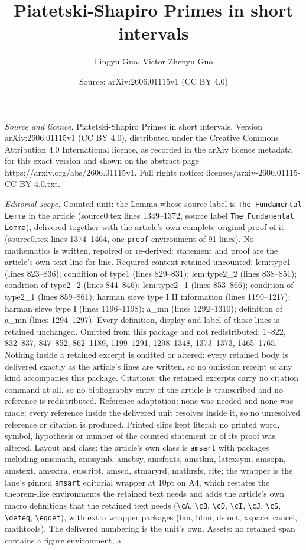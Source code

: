 \documentclass[10pt,a4paper]{amsart}
\title[Piatetski-Shapiro Primes in short intervals]{Piatetski-Shapiro Primes in short intervals}
\author{Lingyu Guo, Victor Zhenyu Guo}
\date{Source: arXiv:2606.01115v1 (CC BY 4.0)}
\begin{document}
\maketitle

\noindent\emph{Source and licence.} Piatetski-Shapiro Primes in short intervals. Version arXiv:2606.01115v1 (CC BY 4.0), distributed under the Creative Commons Attribution 4.0 International licence, as recorded in the arXiv licence metadata for this exact version and shown on the abstract page https://arxiv.org/abs/2606.01115v1. Full rights notice: licenses/arxiv-2606.01115-CC-BY-4.0.txt.\par\smallskip

\noindent\textit{Editorial scope.} Counted unit: the Lemma whose source label is \texttt{The Fundamental Lemma} in the article (source0.tex lines 1349--1372, source label \texttt{The Fundamental Lemma}), delivered together with the article's own complete original proof of it (source0.tex lines 1374--1464, one \texttt{proof} environment of 91 lines). No mathematics is written, repaired or re-derived: statement and proof are the article's own text line for line. Required context retained uncounted: lem:type1 (lines 823--836); condition of type1 (lines 829--831); lem:type2\_2 (lines 838--851); condition of type2\_2 (lines 844--846); lem:type2\_1 (lines 853--866); condition of type2\_1 (lines 859--861); harman sieve type I II information (lines 1190--1217); harman sieve type I (lines 1196--1198); a\_mn (lines 1292--1310); definition of a\_mn (lines 1294--1297). Every definition, display and label of those lines is retained unchanged. Omitted from this package and not redistributed: 1--822, 832--837, 847--852, 862--1189, 1199--1291, 1298--1348, 1373--1373, 1465--1765. Nothing inside a retained excerpt is omitted or altered: every retained body is delivered exactly as the article's lines are written, so no omission receipt of any kind accompanies this package. Citations: the retained excerpts carry no citation command at all, so no bibliography entry of the article is transcribed and no reference is redistributed. Reference adaptation: none was needed and none was made; every reference inside the delivered unit resolves inside it, so no unresolved reference or citation is produced. Printed slips kept literal: no printed word, symbol, hypothesis or number of the counted statement or of its proof was altered. Layout and class: the article's own class is \texttt{amsart} with packages including amsmath, amssymb, amsbsy, amsfonts, amsthm, latexsym, amsopn, amstext, amsxtra, euscript, amscd, stmaryrd, mathrsfs, cite; the wrapper is the lane's pinned \texttt{amsart} editorial wrapper at 10pt on A4, which restates the theorem-like environments the retained text needs and adds the article's own macro definitions that the retained text needs (\texttt{\textbackslash cA}, \texttt{\textbackslash cB}, \texttt{\textbackslash cD}, \texttt{\textbackslash cI}, \texttt{\textbackslash cJ}, \texttt{\textbackslash cS}, \texttt{\textbackslash defeq}, \texttt{\textbackslash eqdef}), with extra wrapper packages (bm, bbm, dsfont, xspace, cancel, mathtools). The delivered numbering is the unit's own. Assets: no retained span contains a figure environment, a 
\end{document}
